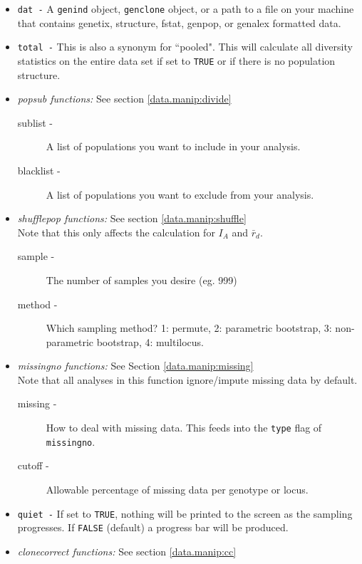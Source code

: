 \documentclass[letterpaper]{article}\usepackage[]{graphicx}\usepackage[]{color}
\begin{document}
\begin{itemize}
  \item \texttt{dat -} A \texttt{genind} object, \texttt{genclone} object, or a 
  path to a file on your machine that contains genetix, structure, fstat, genpop,
  or genalex formatted data.
  \item \texttt{total -} This is also a synonym for ``pooled". This will calculate all diversity statistics on the entire data set if set to \texttt{TRUE} or if there is no population structure.
  \item \emph{popsub functions:} See section \ref{data.manip:divide}
  \begin{description}
    \item[sublist -] A list of populations you want to include in your analysis.
    \item[blacklist -] A list of populations you want to exclude from your analysis.
  \end{description}
  \item \emph{shufflepop functions:} See section \ref{data.manip:shuffle} \\ Note that this only affects the calculation for $I_A$ and $\bar r_d$.
  \begin{description}
    \item[sample -] The number of samples you desire (eg. 999)
    \item[method -] Which sampling method? 1: permute, 2: parametric bootstrap, 3: non-parametric bootstrap, 4: multilocus.
  \end{description}
  \item \emph{missingno functions:} See Section \ref{data.manip:missing} \\ Note that all analyses in this function ignore/impute missing data by default.
    \begin{description}
      \item[missing -] How to deal with missing data. This feeds into the \texttt{type} flag of \texttt{missingno}.
      \item[cutoff -] Allowable percentage of missing data per genotype or locus.
    \end{description}
  \item \texttt{quiet -} If set to \texttt{TRUE}, nothing will be printed to the screen as the sampling progresses. If \texttt{FALSE} (default) a progress bar will be produced.
  \item \emph{clonecorrect functions:} See section \ref{data.manip:cc}
  \begin{description}

\end{description}
\end{itemize}
\end{document}
